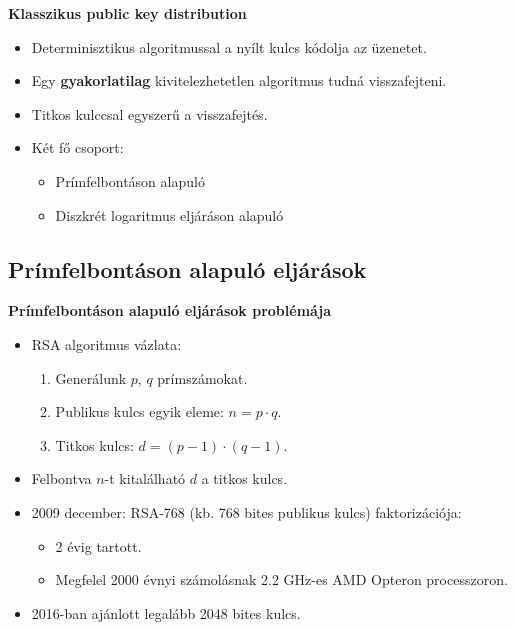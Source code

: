 \documentclass{beamer}
\begin{document}
    \begin{frame}

        \center

        \textbf{Klasszikus public key distribution}

        \begin{itemize}
            \item Determinisztikus algoritmussal a nyílt kulcs kódolja az üzenetet.
            \item Egy \textbf{gyakorlatilag} kivitelezhetetlen algoritmus tudná visszafejteni.
            \item Titkos kulccsal egyszerű a visszafejtés.
            \item Két fő csoport:
                \begin{itemize}
                    \item Prímfelbontáson alapuló
                    \item Diszkrét logaritmus eljáráson alapuló
                \end{itemize}
        \end{itemize}

    \end{frame}

    \subsection{Prímfelbontáson alapuló eljárások}

    \begin{frame}

        \center

        \textbf{Prímfelbontáson alapuló eljárások problémája}

        \begin{itemize}
            \item RSA algoritmus vázlata:
                \begin{enumerate}
                    \item Generálunk $p$, $q$ prímszámokat.
                    \item Publikus kulcs egyik eleme: $n = p \cdot q$.
                    \item Titkos kulcs: $d = (p - 1) \cdot (q - 1)$.
                \end{enumerate}
            \item Felbontva $n$-t kitalálható $d$ a titkos kulcs.
            \item 2009 december: RSA-768 (kb. 768 bites publikus kulcs) faktorizációja:
                \begin{itemize}
                    \item 2 évig tartott.
                    \item Megfelel 2000 évnyi számolásnak 2.2 GHz-es AMD Opteron processzoron.
                \end{itemize}
            \item 2016-ban ajánlott legalább 2048 bites kulcs.
        \end{itemize}

    \end{frame}
\end{document}

